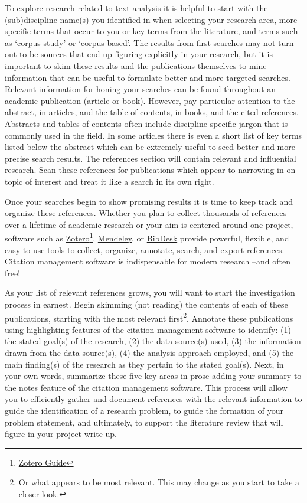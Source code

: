 \documentclass[
  letterpaper,
]{latex/krantz}
\begin{document}
To explore research related to text analysis it is helpful to start with
the (sub)discipline name(s) you identified in when selecting your
research area, more specific terms that occur to you or key terms from
the literature, and terms such as `corpus study' or `corpus-based'. The
results from first searches may not turn out to be sources that end up
figuring explicitly in your research, but it is important to skim these
results and the publications themselves to mine information that can be
useful to formulate better and more targeted searches. Relevant
information for honing your searches can be found throughout an academic
publication (article or book). However, pay particular attention to the
abstract, in articles, and the table of contents, in books, and the
cited references. Abstracts and tables of contents often include
discipline-specific jargon that is commonly used in the field. In some
articles there is even a short list of key terms listed below the
abstract which can be extremely useful to seed better and more precise
search results. The references section will contain relevant and
influential research. Scan these references for publications which
appear to narrowing in on topic of interest and treat it like a search
in its own right.

Once your searches begin to show promising results it is time to keep
track and organize these references. Whether you plan to collect
thousands of references over a lifetime of academic research or your aim
is centered around one project, software such as
\href{https://www.zotero.org/}{Zotero}\footnote{\href{https://guides.zsr.wfu.edu/zotero}{Zotero
  Guide}},
\href{https://www.mendeley.com/reference-management/reference-manager}{Mendeley},
or \href{https://bibdesk.sourceforge.io/}{BibDesk} provide powerful,
flexible, and easy-to-use tools to collect, organize, annotate, search,
and export references. Citation management software is indispensable for
modern research --and often free!

As your list of relevant references grows, you will want to start the
investigation process in earnest. Begin skimming (not reading) the
contents of each of these publications, starting with the most relevant
first\footnote{Or what appears to be most relevant. This may change as
  you start to take a closer look.}. Annotate these publications using
highlighting features of the citation management software to identify:
(1) the stated goal(s) of the research, (2) the data source(s) used, (3)
the information drawn from the data source(s), (4) the analysis approach
employed, and (5) the main finding(s) of the research as they pertain to
the stated goal(s). Next, in your own words, summarize these five key
areas in prose adding your summary to the notes feature of the citation
management software. This process will allow you to efficiently gather
and document references with the relevant information to guide the
identification of a research problem, to guide the formation of your
problem statement, and ultimately, to support the literature review that
will figure in your project write-up.
\end{document}
